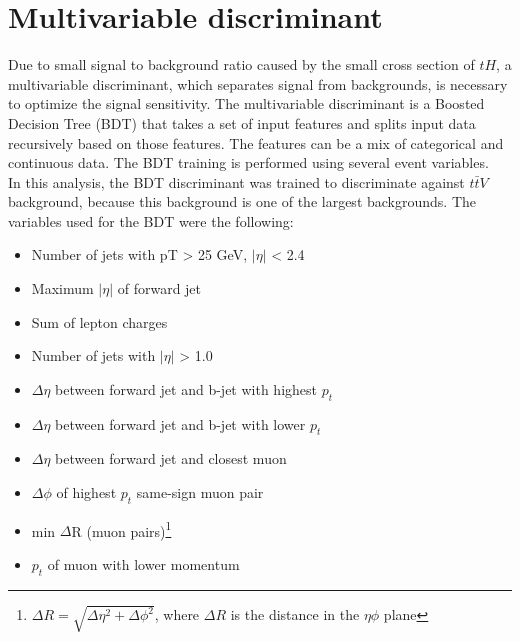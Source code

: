 

\pagebreak
\section{Multivariable discriminant}
Due to small signal to background ratio caused by the small cross section of $tH$, a multivariable discriminant, which separates signal from backgrounds, is necessary to optimize the signal sensitivity. The multivariable discriminant is a Boosted Decision Tree (BDT) that takes a set of input features and splits input data recursively based on those features.  The features can be a mix of categorical and continuous data.
The BDT training is performed using several event variables.
\\

In this analysis, the BDT discriminant was trained to discriminate against $t\bar{t}V$ background, because this background is one of the largest backgrounds. The variables used for the BDT were the following:

\begin{itemize}
\item Number of jets with pT > 25 GeV, $|\eta|$ < 2.4
\item Maximum $|\eta|$ of forward jet
\item Sum of lepton charges
\item Number of jets with $|\eta|$ > 1.0
\item $\Delta\eta$ between forward  jet and b-jet with highest $p_t$
\item $\Delta\eta$ between forward jet and  b-jet with lower $p_t$
\item $\Delta\eta$ between forward jet and closest muon
\item $\Delta\phi$ of highest $p_t$ same-sign muon pair
\item min $\Delta$R (muon pairs)\footnote{$\Delta R =  \sqrt{ \Delta\eta^2  + \Delta\phi^2}$, where $\Delta R$ is the distance in the $\eta \phi$ plane}
\item $p_t$ of muon with lower momentum
\end{itemize}

